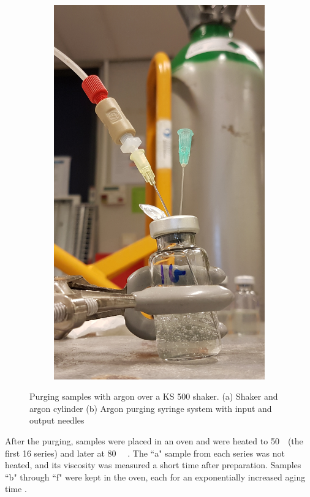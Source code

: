 \begin{figure}[p]
\begin{subfigure}{0.45\textwidth}
        \includegraphics[width=\linewidth]{img/fig/argonPurge.jpg}
        \caption{} \label{fig:argonPurge}
    \end{subfigure}
    \caption{Purging samples with argon over a KS 500 shaker. (a) Shaker and argon cylinder (b) Argon purging syringe system with input and output needles}
    \label{fig:shaking}
\end{figure}

After the purging, samples were placed in an oven and were heated to 50~\celsius~(the first 16 series) and later at 80~\celsius~ \why. The ``a" sample from each series was not heated, and its viscosity was measured a short time after preparation. Samples ``b" through ``f" were kept in the oven, each for an exponentially increased aging time \why. 

